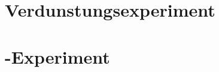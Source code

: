 
\label{cha:con}
\section{Verdunstungsexperiment}
\label{con:eva}
\section{\COT-Experiment}
\label{con:cot}
